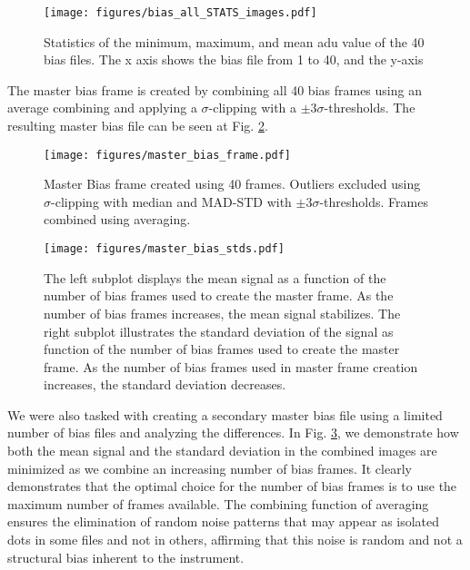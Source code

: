 \documentclass[twocolumn]{aastex631}
\begin{document}
\begin{figure}[ht!]
    \begin{centering}
        \texttt{[image: figures/bias\_all\_STATS\_images.pdf]}
        \caption{Statistics of the minimum, maximum, and mean adu value of the 40 bias files. The x axis shows the bias file from 1 to 40, and the y-axis}
        \label{fig:bias_STATS}
    \end{centering}
\end{figure}

The master bias frame is created by combining all 40 bias frames using an average combining and applying a $\sigma$-clipping with a $\pm3\sigma$-thresholds. The resulting master bias file can be seen at Fig. \ref{fig:master_bias}.

\begin{figure}[ht!]
    \begin{centering}
        \texttt{[image: figures/master\_bias\_frame.pdf]}
        \caption{
            Master Bias frame created using 40 frames. Outliers excluded using $\sigma$-clipping with median and MAD-STD with $\pm3\sigma$-thresholds. Frames combined using averaging.
        }
        \label{fig:master_bias}
    \end{centering}
\end{figure}


\begin{figure}[ht!]
    \begin{centering}
        \texttt{[image: figures/master\_bias\_stds.pdf]}
        \caption{The left subplot  displays the mean signal as a function of the number of bias frames used to create the master frame. As the number of bias frames increases, the mean signal stabilizes. 
        The right subplot illustrates the standard deviation of the signal as function of the number of bias frames used to create the master frame. As the number of bias frames used in master frame creation increases, the standard deviation decreases.}
        \label{fig:bias_frame_stats}
    \end{centering}
\end{figure}
We were also tasked with creating a secondary master bias file using a limited number of bias files and analyzing the differences. In Fig. \ref{fig:bias_frame_stats}, we demonstrate how both the mean signal and the standard deviation in the combined images are minimized as we combine an increasing number of bias frames. It clearly demonstrates that the optimal choice for the number of bias frames is to use the maximum number of frames available. The combining function of averaging ensures the elimination of random noise patterns that may appear as isolated dots in some files and not in others, affirming that this noise is random and not a structural bias inherent to the instrument.
\end{document}
